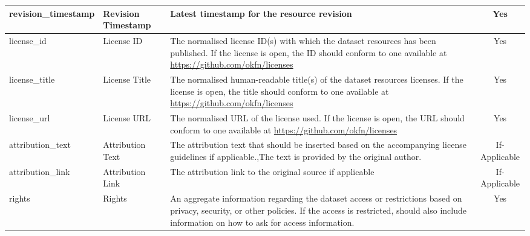 \begin{center}
{\begin{longtable}[h]{|l|p{2cm}|p{9cm}|c|}
revision\_timestamp               & Revision Timestamp               & Latest timestamp for the resource revision                                                                                                                                                                              & Yes                                 \\ \hline
license\_id                       & License ID                       & The normalised license ID(s) with which the dataset resources has been published. If the license is open, the ID should conform to one available at \url{https://github.com/okfn/licenses}                            & Yes                                 \\ \hline
license\_title                    & License Title                    & The normalised human-readable title(s) of the dataset resources licenses. If the license is open, the title should conform to one available at \url{https://github.com/okfn/licenses}                                 & Yes                                 \\ \hline
license\_url                      & License URL                      & The normalised URL of the license used. If the license is open, the URL should conform to one available at \url{https://github.com/okfn/licenses}                                                                     & Yes                                 \\ \hline
attribution\_text                 & Attribution Text                 & The attribution text that should be inserted based on the accompanying license guidelines if applicable.,The text is provided by the original author.                                                                   & If-Applicable                       \\ \hline
attribution\_link                 & Attribution Link                 & The attribution link to the original source if applicable                                                                                                                                                               & If-Applicable                       \\ \hline
rights                            & Rights                           & An aggregate information regarding the dataset access or restrictions based on privacy, security, or other policies. If the access is restricted, should also include information on how to ask for access information. & Yes                                 \\ \hline

\end{longtable}}
\end{center}
